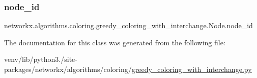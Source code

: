 \subsubsection{\texorpdfstring{node\+\_\+id}{node\_id}}
{\footnotesize\ttfamily networkx.\+algorithms.\+coloring.\+greedy\+\_\+coloring\+\_\+with\+\_\+interchange.\+Node.\+node\+\_\+id}



The documentation for this class was generated from the following file\+:\begin{DoxyCompactItemize}
\item 
venv/lib/python3./site-\/packages/networkx/algorithms/coloring/\hyperlink{greedy__coloring__with__interchange_8py}{greedy\+\_\+coloring\+\_\+with\+\_\+interchange.\+py}\end{DoxyCompactItemize}
